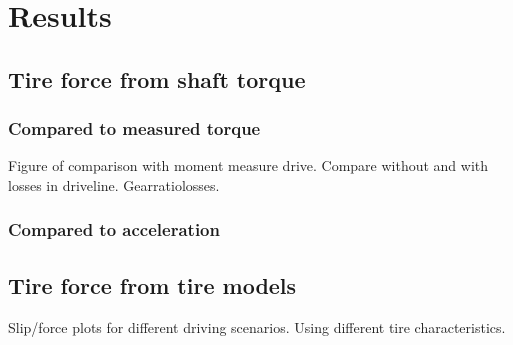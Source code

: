 \chapter{Results}



\section{Tire force from shaft torque}



\subsection{Compared to measured torque}

Figure of comparison with moment measure drive. Compare without and with losses in driveline. Gearratiolosses.

\subsection{Compared to acceleration}



\section{Tire force from tire models}

Slip/force plots for different driving scenarios. Using different tire characteristics.  
